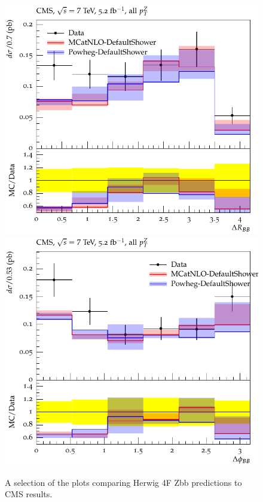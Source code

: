 \documentclass[11pt]{cernrep}
\begin{document}
\begin{figure}[htbp]
   \includegraphics[scale=0.65]{figs/zbb/herwig4F/d01-x01-y01.pdf} 
   \includegraphics[scale=0.65]{figs/zbb/herwig4F/d02-x01-y01.pdf} 
\caption{A selection of the plots comparing Herwig 4F Zbb predictions to CMS results.}
\label{zbb-herwig4F-cms}
\end{figure}
\end{document}
